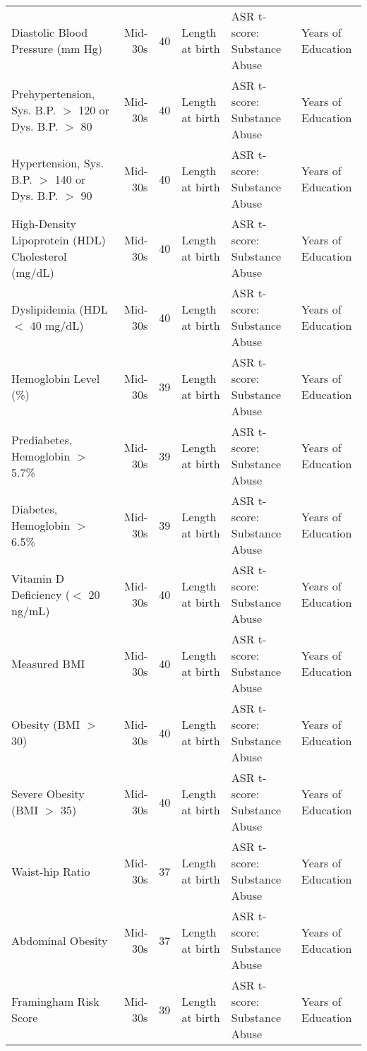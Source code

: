 \begin{tabular}{l r r l l l}
Diastolic Blood Pressure (mm Hg)	&	Mid-30s	&	40	&	Length at birth	&	ASR t-score: Substance Abuse	&	Years of Education	\\
Prehypertension, Sys. B.P. $>$ 120 or Dys. B.P. $>$ 80	&	Mid-30s	&	40	&	Length at birth	&	ASR t-score: Substance Abuse	&	Years of Education	\\
Hypertension, Sys. B.P. $>$ 140 or Dys. B.P. $>$ 90	&	Mid-30s	&	40	&	Length at birth	&	ASR t-score: Substance Abuse	&	Years of Education	\\
High-Density Lipoprotein (HDL) Cholesterol (mg/dL)	&	Mid-30s	&	40	&	Length at birth	&	ASR t-score: Substance Abuse	&	Years of Education	\\
Dyslipidemia (HDL $<$ 40 mg/dL)	&	Mid-30s	&	40	&	Length at birth	&	ASR t-score: Substance Abuse	&	Years of Education	\\
Hemoglobin Level (\%)	&	Mid-30s	&	39	&	Length at birth	&	ASR t-score: Substance Abuse	&	Years of Education	\\
Prediabetes, Hemoglobin $>$ 5.7\%	&	Mid-30s	&	39	&	Length at birth	&	ASR t-score: Substance Abuse	&	Years of Education	\\
Diabetes, Hemoglobin $>$ 6.5\%	&	Mid-30s	&	39	&	Length at birth	&	ASR t-score: Substance Abuse	&	Years of Education	\\
Vitamin D Deficiency ($<$ 20 ng/mL)	&	Mid-30s	&	40	&	Length at birth	&	ASR t-score: Substance Abuse	&	Years of Education	\\
Measured BMI	&	Mid-30s	&	40	&	Length at birth	&	ASR t-score: Substance Abuse	&	Years of Education	\\
Obesity (BMI $>$ 30)	&	Mid-30s	&	40	&	Length at birth	&	ASR t-score: Substance Abuse	&	Years of Education	\\
Severe Obesity (BMI $>$ 35)	&	Mid-30s	&	40	&	Length at birth	&	ASR t-score: Substance Abuse	&	Years of Education	\\
Waist-hip Ratio	&	Mid-30s	&	37	&	Length at birth	&	ASR t-score: Substance Abuse	&	Years of Education	\\
Abdominal Obesity	&	Mid-30s	&	37	&	Length at birth	&	ASR t-score: Substance Abuse	&	Years of Education	\\
Framingham Risk Score	&	Mid-30s	&	39	&	Length at birth	&	ASR t-score: Substance Abuse	&	Years of Education	\\
\hline\hline																																	
\end{tabular}